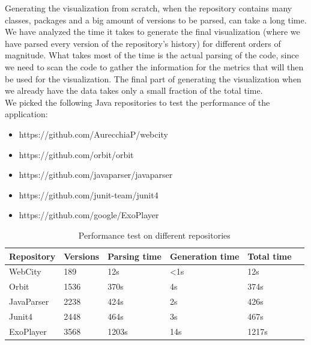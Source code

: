 \documentclass[]{usiinfbachelorproject}
\begin{document}
Generating the visualization from scratch, when the repository contains many classes, packages and a big amount of versions to be parsed, can take a long time. We have analyzed the time it takes to generate the final visualization (where we have parsed every version of the repository's history) for different orders of magnitude. What takes most of the time is the actual parsing of the code, since we need to scan the code to gather the information for the metrics that will then be used for the visualization. The final part of generating the visualization when we already have the data takes only a small fraction of the total time.\\

We picked the following Java repositories to test the performance of the application:

\begin{itemize}
    \item https://github.com/AurecchiaP/webcity
    \item https://github.com/orbit/orbit
    \item https://github.com/javaparser/javaparser
    \item https://github.com/junit-team/junit4
    \item https://github.com/google/ExoPlayer
\end{itemize}

\begin{table}[H]
    \begin{center}
        \begin{tabular}{ | l | l | l | l | l | l |}
        \hline
        Repository & Versions & Parsing time & Generation time & Total time \\ \hline
        WebCity & 189 & 12s & <1s & 12s \\ \hline
        Orbit & 1536 & 370s & 4s & 374s \\ \hline
        JavaParser & 2238 & 424s & 2s & 426s \\ \hline
        Junit4 & 2448 & 464s & 3s & 467s \\ \hline
        ExoPlayer & 3568 & 1203s & 14s & 1217s \\ \hline
        \end{tabular}
    \end{center}
    \caption{Performance test on different repositories}
    \label{tab:performance}
\end{table}
\end{document}
